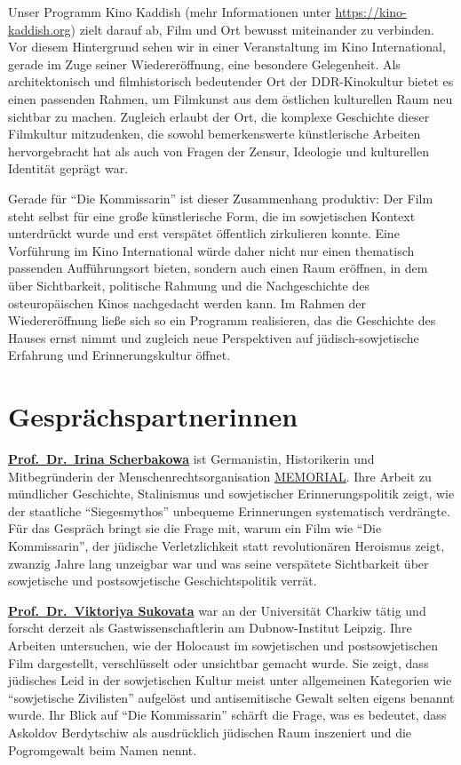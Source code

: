 \documentclass[11pt,a4paper]{article}
\begin{document}
Unser Programm Kino Kaddish (mehr Informationen unter \url{https://kino-kaddish.org}) zielt darauf ab, Film und Ort bewusst miteinander zu verbinden. Vor diesem Hintergrund sehen wir in einer Veranstaltung im Kino International, gerade im Zuge seiner Wiederer\"offnung, eine besondere Gelegenheit. Als architektonisch und filmhistorisch bedeutender Ort der DDR-Kinokultur bietet es einen passenden Rahmen, um Filmkunst aus dem \"ostlichen kulturellen Raum neu sichtbar zu machen. Zugleich erlaubt der Ort, die komplexe Geschichte dieser Filmkultur mitzudenken, die sowohl bemerkenswerte k\"unstlerische Arbeiten hervorgebracht hat als auch von Fragen der Zensur, Ideologie und kulturellen Identit\"at gepr\"agt war.

Gerade f\"ur \enquote{Die Kommissarin} ist dieser Zusammenhang produktiv: Der Film steht selbst f\"ur eine gro{\ss}e k\"unstlerische Form, die im sowjetischen Kontext unterdr\"uckt wurde und erst versp\"atet \"offentlich zirkulieren konnte. Eine Vorf\"uhrung im Kino International w\"urde daher nicht nur einen thematisch passenden Auff\"uhrungsort bieten, sondern auch einen Raum er\"offnen, in dem \"uber Sichtbarkeit, politische Rahmung und die Nachgeschichte des osteurop\"aischen Kinos nachgedacht werden kann. Im Rahmen der Wiederer\"offnung lie{\ss}e sich so ein Programm realisieren, das die Geschichte des Hauses ernst nimmt und zugleich neue Perspektiven auf j\"udisch-sowjetische Erfahrung und Erinnerungskultur \"offnet.

\section*{Gespr\"achspartnerinnen}

\textbf{\href{https://www.zfl-berlin.org/person/scherbakowa.html}{Prof.\ Dr.\ Irina Scherbakowa}} ist Germanistin, Historikerin und Mitbegr\"underin der Menschenrechtsorganisation \href{https://www.memorial.de/}{MEMORIAL}. Ihre Arbeit zu m\"undlicher Geschichte, Stalinismus und sowjetischer Erinnerungspolitik zeigt, wie der staatliche \enquote{Siegesmythos} unbequeme Erinnerungen systematisch verdr\"angte. F\"ur das Gespr\"ach bringt sie die Frage mit, warum ein Film wie \enquote{Die Kommissarin}, der j\"udische Verletzlichkeit statt revolution\"aren Heroismus zeigt, zwanzig Jahre lang unzeigbar war und was seine versp\"atete Sichtbarkeit \"uber sowjetische und postsowjetische Geschichtspolitik verr\"at.

\textbf{\href{https://www.dubnow.de/person/prof-dr-victoryia-a-sukovata}{Prof.\ Dr.\ Viktoriya Sukovata}} war an der Universit\"at Charkiw t\"atig und forscht derzeit als Gastwissenschaftlerin am Dubnow-Institut Leipzig. Ihre Arbeiten untersuchen, wie der Holocaust im sowjetischen und postsowjetischen Film dargestellt, verschl\"usselt oder unsichtbar gemacht wurde. Sie zeigt, dass j\"udisches Leid in der sowjetischen Kultur meist unter allgemeinen Kategorien wie \enquote{sowjetische Zivilisten} aufgel\"ost und antisemitische Gewalt selten eigens benannt wurde. Ihr Blick auf \enquote{Die Kommissarin} sch\"arft die Frage, was es bedeutet, dass Askoldov Berdytschiw als ausdr\"ucklich j\"udischen Raum inszeniert und die Pogromgewalt beim Namen nennt.
\end{document}
